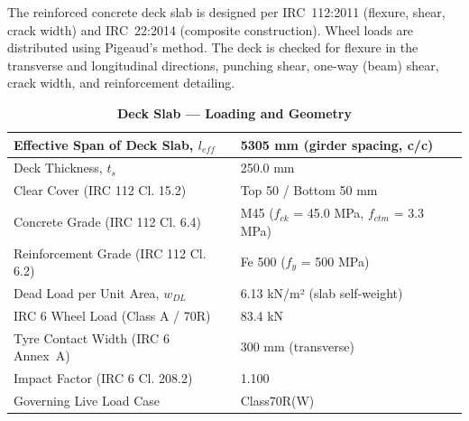 \documentclass[12pt,a4paper]{report}
\numberwithin{table}{chapter}
\numberwithin{figure}{chapter}
\begin{document}
The reinforced concrete deck slab is designed per IRC~112:2011 (flexure, shear, crack width) and IRC~22:2014 (composite construction). Wheel loads are distributed using Pigeaud's method. The deck is checked for flexure in the transverse and longitudinal directions, punching shear, one-way (beam) shear, crack width, and reinforcement detailing.

\vspace{1em}
\begin{longtable}{|L{5.5cm}|p{10.0cm}|}
\caption{\textbf{Deck Slab --- Loading and Geometry}}
\hline
\textnormal{Effective Span of Deck Slab, $l_{eff}$} & 5305 mm (girder spacing, c/c) \\[6pt]
\hline
\textnormal{Deck Thickness, $t_s$} & 250.0 mm \\[6pt]
\hline
\textnormal{Clear Cover (IRC 112 Cl. 15.2)} & Top 50 / Bottom 50 mm \\[6pt]
\hline
\textnormal{Concrete Grade (IRC 112 Cl. 6.4)} & M45 ($f_{ck}$ = 45.0 MPa, $f_{ctm}$ = 3.3 MPa) \\[6pt]
\hline
\textnormal{Reinforcement Grade (IRC 112 Cl. 6.2)} & Fe 500 ($f_y$ = 500 MPa) \\[6pt]
\hline
\textnormal{Dead Load per Unit Area, $w_{DL}$} & 6.13 kN/m² (slab self-weight) \\[6pt]
\hline
\textnormal{IRC 6 Wheel Load (Class A / 70R)} & 83.4 kN \\[6pt]
\hline
\textnormal{Tyre Contact Width (IRC 6 Annex~A)} & 300 mm (transverse) \\[6pt]
\hline
\textnormal{Impact Factor (IRC 6 Cl. 208.2)} & 1.100 \\[6pt]
\hline
\textnormal{Governing Live Load Case} & Class70R(W) \\[6pt]
\hline
\end{longtable}
\end{document}
